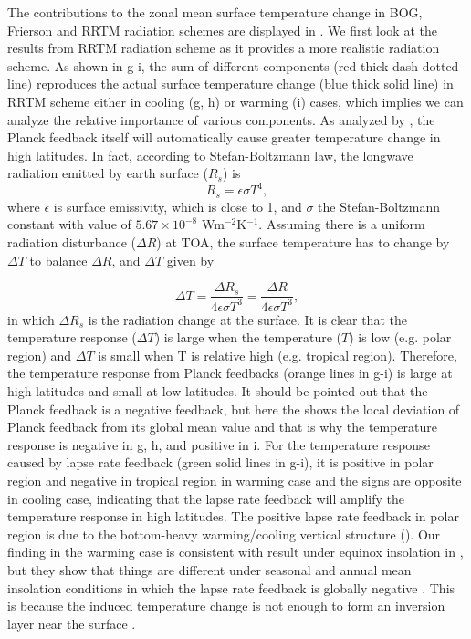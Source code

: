 The contributions to the zonal mean surface temperature change in BOG, Frierson and RRTM radiation schemes are displayed in . We first look at the results from RRTM radiation scheme as it provides a more realistic radiation scheme. As shown in g-i, the sum of different components (red thick dash-dotted line) reproduces the actual surface temperature change (blue thick solid line) in RRTM scheme either in cooling (g, h) or warming (i) cases, which implies we can analyze the relative importance of various components. As analyzed by \cite{Pithan2014}, the Planck feedback itself will automatically cause greater temperature change in high latitudes. In fact, according to Stefan-Boltzmann law, the longwave radiation emitted by earth surface ($R_s$) is
\begin{equation}
	R_s = \epsilon\sigma T^4,
\end{equation}
where $\epsilon$ is surface emissivity, which is close to 1, and $\sigma$ the Stefan-Boltzmann constant with value of $5.67\times 10^{-8}$ Wm$^{-2}$K$^{-1}$. Assuming there is a uniform radiation disturbance ($\Delta R$) at TOA, the surface temperature has to change by $\Delta T$ to balance $\Delta R$, and $\Delta T$ given by

\begin{equation}
\Delta T =\frac{\Delta R_s}{4\epsilon\sigma T^3}=\frac{\Delta R}{4\epsilon\sigma T^3},
\end{equation}
in which $\Delta R_s$ is the radiation change at the surface. It is clear that the temperature response ($\Delta T$) is large when the temperature ($T$) is low (e.g. polar region) and $\Delta T$ is small when T is relative high (e.g. tropical region). Therefore, the temperature response from Planck feedbacks (orange lines in g-i) is large at high latitudes and small at low latitudes. It should be pointed out that the Planck feedback is a negative feedback, but here the  shows the local deviation of Planck feedback from its global mean value and that is why the temperature response is negative in g, h, and positive in i. For the temperature response caused by lapse rate feedback (green solid lines in g-i), it is positive in polar region and negative in tropical region in warming case and the signs are opposite in cooling case, indicating that the lapse rate feedback will amplify the temperature response in high latitudes. The positive lapse rate feedback in polar region is due to the bottom-heavy warming/cooling vertical structure (). Our finding in the warming case is consistent with result under equinox insolation in \cite{Kim2018}, but they show that things are different under seasonal and annual mean insolation conditions in which the lapse rate feedback is globally negative \citep[see Fig. S1 of][]{Kim2018}. This is because the induced temperature change is not enough to form an inversion layer near the surface \citep{Kim2018}. %

